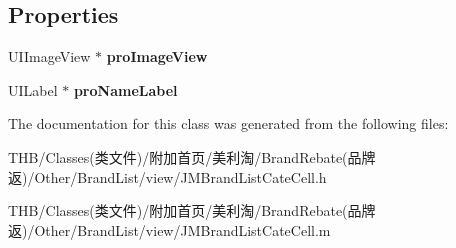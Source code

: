 \subsection*{Properties}
\begin{DoxyCompactItemize}
\item 
\mbox{\label{interface_j_m_brand_list_cate_cell_ae3fdbd98a60d431459dee05498c810bc}} 
U\+I\+Image\+View $\ast$ {\bfseries pro\+Image\+View}
\item 
\mbox{\label{interface_j_m_brand_list_cate_cell_ac79ed38fb33c58e0a43162b061e650e2}} 
U\+I\+Label $\ast$ {\bfseries pro\+Name\+Label}
\end{DoxyCompactItemize}


The documentation for this class was generated from the following files\+:\begin{DoxyCompactItemize}
\item 
T\+H\+B/\+Classes(类文件)/附加首页/美利淘/\+Brand\+Rebate(品牌返)/\+Other/\+Brand\+List/view/J\+M\+Brand\+List\+Cate\+Cell.\+h\item 
T\+H\+B/\+Classes(类文件)/附加首页/美利淘/\+Brand\+Rebate(品牌返)/\+Other/\+Brand\+List/view/J\+M\+Brand\+List\+Cate\+Cell.\+m\end{DoxyCompactItemize}
